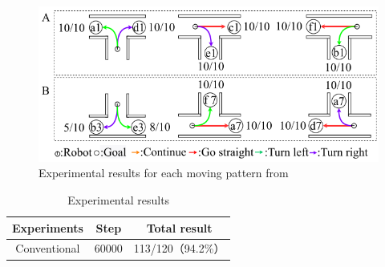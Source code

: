 
\begin{figure}[hbtp]
  \centering
 \includegraphics[keepaspectratio, scale=0.5]
      {images/60000step.png}
 \caption{Experimental results for each moving pattern from \cite{mech}}
 \label{Fig:60000step}
\end{figure}



\begin{table}[hbtp]
  \caption{Experimental results}
  \label{table:result}
  \centering
  \begin{tabular}{|c|c|c|}
    \hline
    Experiments & Step & Total result\\
    \hline
    Conventional & 60000 & 113/120（94.2\%）\\
    \hline
  \end{tabular}
\end{table}


